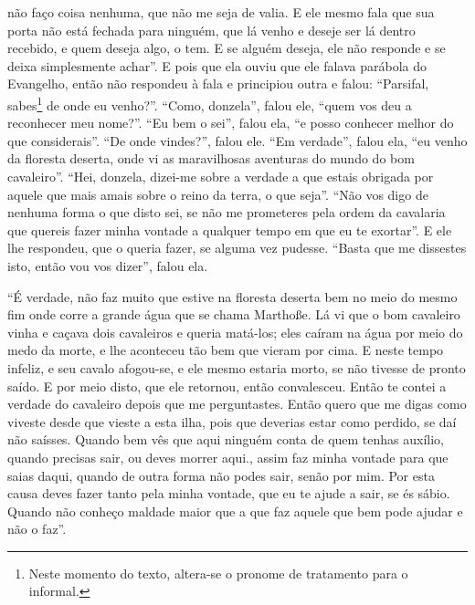 não faço coisa nenhuma, que não me seja de valia. E ele mesmo fala que sua
porta não está fechada para ninguém, que lá venho e deseje ser lá dentro
recebido, e quem deseja algo, o tem. E se alguém deseja, ele não responde e se
deixa simplesmente achar”. E pois que ela ouviu que ele falava
parábola do Evangelho, então não respondeu à fala e principiou outra e falou:
“Parsifal, sabes\footnote{ Neste momento do texto, altera-se o pronome de
tratamento para o informal.}  de onde eu venho?”. “Como, donzela”,
falou ele, “quem vos deu a reconhecer meu nome?”. “Eu bem o sei”, falou ela, “e
posso conhecer melhor do que considerais”. “De onde vindes?”, falou ele. “Em
verdade”, falou ela, “eu venho da floresta deserta, onde vi as maravilhosas
aventuras do mundo do bom cavaleiro”. “Hei, donzela, dizei-me sobre a verdade a
que estais obrigada por aquele que mais amais sobre o reino da terra, o que
seja”. “Não vos digo de nenhuma forma o que disto sei, se não me prometeres
pela ordem da cavalaria que quereis fazer minha vontade a qualquer tempo em que
eu te exortar”. E ele lhe respondeu, que o queria fazer, se alguma vez pudesse.
“Basta que me dissestes isto, então vou vos dizer”, falou ela.

“É verdade, não faz muito que estive na floresta deserta bem no meio do
mesmo fim onde corre a grande água que se chama Marthoße. Lá vi que o bom
cavaleiro vinha e caçava dois cavaleiros e queria matá-los; eles caíram na água
por meio do medo da morte, e lhe aconteceu tão bem que vieram por cima. E neste
tempo infeliz, e seu cavalo afogou-se, e ele mesmo estaria morto, se não
tivesse de pronto saído. E por meio disto, que ele retornou, então convalesceu.
Então te contei a verdade do cavaleiro depois que me perguntastes. Então quero
que me digas como viveste desde que vieste a esta ilha, pois que deverias estar
como perdido, se daí não saísses. Quando bem vês que aqui ninguém conta de quem
tenhas auxílio, quando precisas sair, ou deves morrer aqui., assim faz minha
vontade para que saias daqui, quando de outra forma não podes sair, senão por
mim. Por esta causa deves fazer tanto pela minha vontade, que eu te ajude a
sair, se és sábio. Quando não conheço maldade maior que a que faz aquele que
bem pode ajudar e não o faz”.

